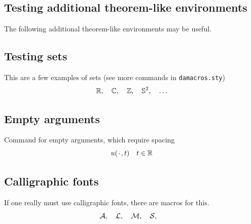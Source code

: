 \documentclass[a4paper,baskervaldx]{daarticle}
\begin{document}
\subsection{Testing additional theorem-like environments} The following additional
theorem-like environments may be useful.




\subsection{Testing sets}
This are a few examples of sets (see more commands in \texttt{damacros.sty})
\[
  \mathbb{R}, \quad
  \mathbb{C}, \quad
  \mathbb{Z}, \quad
  \mathbb{S}^2, \quad
  \ldots
\]

\subsection{Empty arguments}
Command for empty arguments, which require spacing
\[
  u({\mkern 2mu\cdot\mkern 2mu},t) \quad t \in \mathbb{R}
\]

\subsection{Calligraphic fonts}
If one really must use calligraphic fonts, there are macros for this.
\[
  \mathcal{A}, \quad
  \mathcal{L}, \quad
  \mathcal{M}, \quad
  \mathcal{S}, \quad
\]




\end{document}
